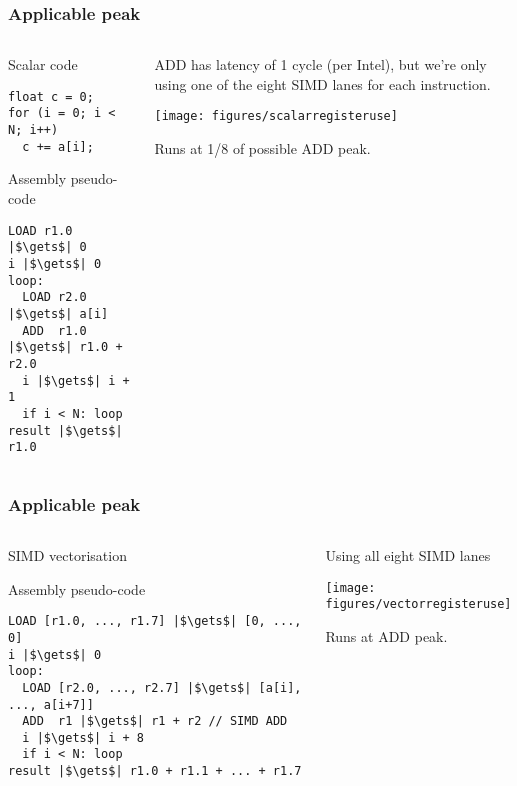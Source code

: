 \documentclass[presentation,aspectratio=43,10pt]{beamer}
\begin{document}
\begin{frame}[fragile]
  \frametitle{Applicable peak}
  \begin{columns}
    \begin{column}{0.4\textwidth}
      Scalar code

\begin{verbatim}
float c = 0;
for (i = 0; i < N; i++)
  c += a[i];
\end{verbatim}

      Assembly pseudo-code
      
\begin{verbatim}
LOAD r1.0 |$\gets$| 0
i |$\gets$| 0
loop:
  LOAD r2.0 |$\gets$| a[i]
  ADD  r1.0 |$\gets$| r1.0 + r2.0
  i |$\gets$| i + 1
  if i < N: loop
result |$\gets$| r1.0
\end{verbatim}

    \end{column}
    \begin{column}{0.5\textwidth}
      ADD has latency of 1 cycle (per Intel), but we're only using one
      of the eight SIMD lanes for each instruction.

      \begin{center}
        \texttt{[image: figures/scalarregisteruse]}
      \end{center}

      Runs at 1/8 of possible ADD peak.
    \end{column}
  \end{columns}
\end{frame}

\begin{frame}[fragile]
  \frametitle{Applicable peak}
  \begin{columns}
    \begin{column}{0.6\textwidth}
      SIMD vectorisation

      Assembly pseudo-code
      
\begin{verbatim}
LOAD [r1.0, ..., r1.7] |$\gets$| [0, ..., 0]
i |$\gets$| 0
loop:
  LOAD [r2.0, ..., r2.7] |$\gets$| [a[i], ..., a[i+7]]
  ADD  r1 |$\gets$| r1 + r2 // SIMD ADD
  i |$\gets$| i + 8
  if i < N: loop
result |$\gets$| r1.0 + r1.1 + ... + r1.7
\end{verbatim}

    \end{column}
    \begin{column}{0.3\textwidth}
      Using all eight SIMD lanes

      \begin{center}
        \texttt{[image: figures/vectorregisteruse]}
      \end{center}

      Runs at ADD peak.
    \end{column}
  \end{columns}
\end{frame}
\end{document}
